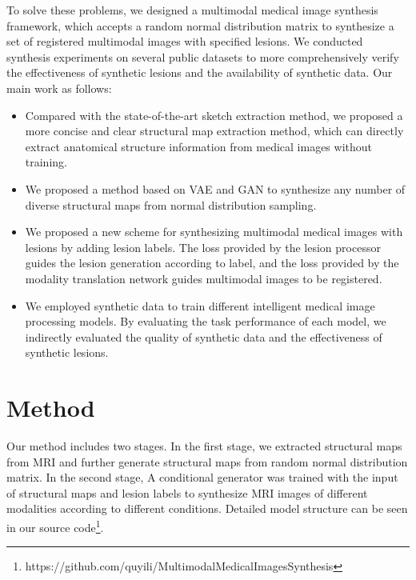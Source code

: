 \documentclass[runningheads]{llncs}
\begin{document}
	To solve these problems, we designed a multimodal medical image synthesis framework, which accepts a random normal distribution matrix to synthesize a set of registered multimodal images with specified lesions. We conducted synthesis experiments on several public datasets to more comprehensively verify the effectiveness of synthetic lesions and the availability of synthetic data. Our main work as follows:
	\begin{itemize}
	\item Compared with the state-of-the-art sketch extraction method, we proposed a more concise and clear structural map extraction method, which can directly extract anatomical structure information from medical images without training.
	\item We proposed a method based on VAE and GAN to synthesize any number of diverse structural maps from normal distribution sampling.
	\item We proposed a new scheme for synthesizing multimodal medical images with lesions by adding lesion labels. The loss provided by the lesion processor guides the lesion generation according to label, and the loss provided by the modality translation network guides multimodal images to be registered.
	\item We employed synthetic data to train different intelligent medical image processing models. By evaluating the task performance of each model, we indirectly evaluated the quality of synthetic data and the effectiveness of synthetic lesions.
	\end{itemize}

	\section{Method}
	\label{method}
	Our method includes two stages. In the first stage, we extracted structural maps from MRI and further generate structural maps from random normal distribution matrix. In the second stage, A conditional generator was trained with the input of structural maps and lesion labels to synthesize MRI images of different modalities according to different conditions. Detailed model structure can be seen in our source code\footnote{https://github.com/quyili/MultimodalMedicalImagesSynthesis}.
	
\end{document}
